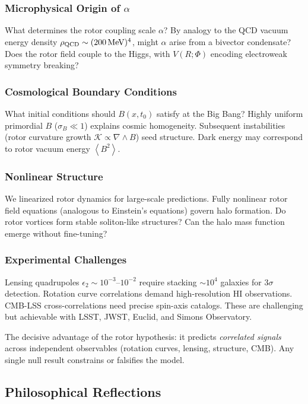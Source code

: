\documentclass[11pt,a4paper]{article}
\numberwithin{equation}{section}
\theoremstyle{plain}
\theoremstyle{definition}
\theoremstyle{remark}
\newcommand{\avg}[1]{\left\langle #1 \right\rangle}
\begin{document}
\subsubsection{Microphysical Origin of $\alpha$}

What determines the rotor coupling scale $\alpha$? By analogy to the QCD vacuum energy density $\rho_{\rm QCD}\sim (200\,\text{MeV})^4$, might $\alpha$ arise from a bivector condensate? Does the rotor field couple to the Higgs, with $V(R;\Phi)$ encoding electroweak symmetry breaking?

\subsubsection{Cosmological Boundary Conditions}

What initial conditions should $B(x,t_0)$ satisfy at the Big Bang? Highly uniform primordial $B$ ($\sigma_B\ll 1$) explains cosmic homogeneity. Subsequent instabilities (rotor curvature growth $\mathcal{K}\propto\nabla\wedge B$) seed structure. Dark energy may correspond to rotor vacuum energy $\avg{B^2}$.

\subsubsection{Nonlinear Structure}

We linearized rotor dynamics for large-scale predictions. Fully nonlinear rotor field equations (analogous to Einstein's equations) govern halo formation. Do rotor vortices form stable soliton-like structures? Can the halo mass function emerge without fine-tuning?

\subsubsection{Experimental Challenges}

Lensing quadrupoles $\epsilon_2\sim 10^{-3}$--$10^{-2}$ require stacking $\sim 10^4$ galaxies for $3\sigma$ detection. Rotation curve correlations demand high-resolution HI observations. CMB-LSS cross-correlations need precise spin-axis catalogs. These are challenging but achievable with LSST, JWST, Euclid, and Simons Observatory.

The decisive advantage of the rotor hypothesis: it predicts \emph{correlated signals} across independent observables (rotation curves, lensing, structure, CMB). Any single null result constrains or falsifies the model.

\subsection{Philosophical Reflections}
\end{document}
